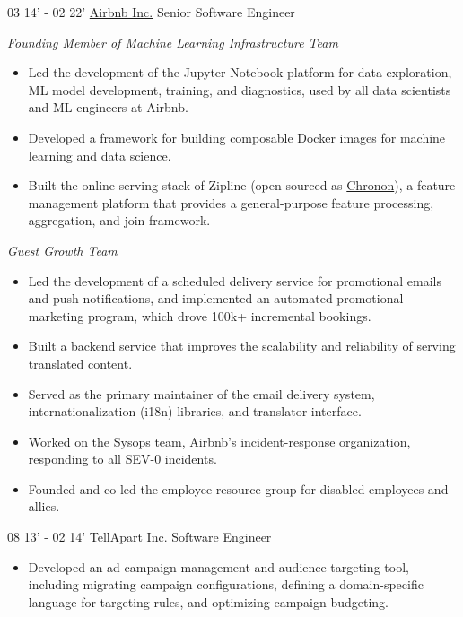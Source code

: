 \documentclass[]{patyoon-cv}
\begin{document}
\begin{entrylist}
\entry
{03 14' - 02 22'}
{\href{https://www.airbnb.com/}{Airbnb Inc.}}
{Senior Software Engineer}
{\begin{spacing}{0.5} \end{spacing}
\emph{\small Founding Member of Machine Learning Infrastructure Team}\\
\begin{itemize}
\item Led the development of the Jupyter Notebook platform for data exploration, ML model development, training, and diagnostics, used by all data scientists and ML engineers at Airbnb.
\item Developed a framework for building composable Docker images for machine learning and data science.
\item Built the online serving stack of Zipline (open sourced as \href{https://chronon.ai/}{Chronon}), a feature management platform that provides a general-purpose feature processing, aggregation, and join framework.
\end{itemize}
\begin{spacing}{1.5} \end{spacing}
\emph{\small Guest Growth Team}\\
\begin{itemize}
\item Led the development of a scheduled delivery service for promotional emails and push notifications, and implemented an automated promotional marketing program, which drove 100k+ incremental bookings.
\item Built a backend service that improves the scalability and reliability of serving translated content.
\item Served as the primary maintainer of the email delivery system, internationalization (i18n) libraries, and translator interface.
\item Worked on the Sysops team, Airbnb's incident-response organization, responding to all SEV-0 incidents.
\item Founded and co-led the employee resource group for disabled employees and allies.
\end{itemize}
}
\entry
{08 13' - 02 14'}
{\href{https://tellapart.com/}{TellApart Inc.}}
{Software Engineer}
{\begin{itemize}
\item Developed an ad campaign management and audience targeting tool, including migrating campaign configurations, defining a domain-specific language for targeting rules, and optimizing campaign budgeting.

\end{itemize}}
\end{entrylist}
\end{document}
